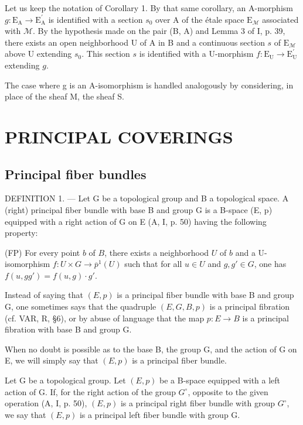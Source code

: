 Let us keep the notation of Corollary 1. By that same corollary, an A-morphism \(g \colon \mathrm{E}_{\mathrm{A}} \to \mathrm{E}_{\mathrm{A}}^{\prime}\) is identified with a section \(s_0\) over A of the étale space \(\mathrm{E}_{\mathcal{M}}\) associated with \(\mathcal{M}\). By the hypothesis made on the pair (B, A) and Lemma 3 of I, p. 39, there exists an open neighborhood U of A in B and a continuous section \(s\) of \(\mathrm{E}_{\mathcal{M}}\) above U extending \(s_0\). This section \(s\) is identified with a U-morphism \(f \colon \mathrm{E}_{\mathrm{U}} \to \mathrm{E}_{\mathrm{U}}^{\prime}\) extending \(g\).

The case where g is an A-isomorphism is handled analogously by considering, in place of the sheaf M, the sheaf S.

\section{PRINCIPAL COVERINGS}

\subsection{Principal fiber bundles}

DEFINITION 1. --- Let G be a topological group and B a topological space. A (right) principal fiber bundle with base B and group G is a B-space (E, p) equipped with a right action of G on E (A, I, p. 50) having the following property:

(FP) For every point \(b\) of \(B\), there exists a neighborhood \(U\) of \(b\) and a U-isomorphism \(f\colon U\times G\to \overline{p}^{1}(U)\) such that for all \(u\in U\) and \(g,g'\in G\), one has \(f(u,gg')=f(u,g)\cdot g'\).

Instead of saying that \((E, p)\) is a principal fiber bundle with base B and group G, one sometimes says that the quadruple \((E, G, B, p)\) is a principal fibration (cf. VAR, R, §6), or by abuse of language that the map \(p: E \to B\) is a principal fibration with base B and group G.

When no doubt is possible as to the base B, the group G, and the action of G on E, we will simply say that \((E, p)\) is a principal fiber bundle.

Let G be a topological group. Let \((E,p)\) be a B-space equipped with a left action of G. If, for the right action of the group \(G^{\circ}\), opposite to the given operation (A, I, p. 50), \((E,p)\) is a principal right fiber bundle with group \(G^{\circ}\), we say that \((E,p)\) is a principal left fiber bundle with group G.

